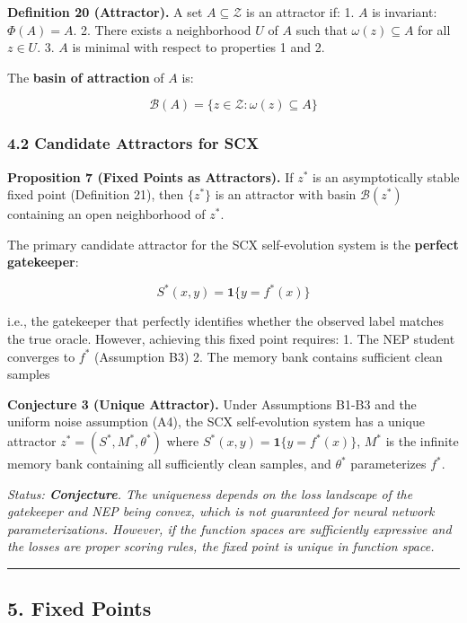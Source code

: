 \documentclass[
  12pt,
]{article}
\begin{document}
\textbf{Definition 20 (Attractor).} A set \(A \subseteq \mathcal{Z}\) is
an attractor if: 1. \(A\) is invariant: \(\Phi(A) = A\). 2. There exists
a neighborhood \(U\) of \(A\) such that \(\omega(z) \subseteq A\) for
all \(z \in U\). 3. \(A\) is minimal with respect to properties 1 and 2.

The \textbf{basin of attraction} of \(A\) is:

\[\mathcal{B}(A) = \{ z \in \mathcal{Z} : \omega(z) \subseteq A \}\]

\subsubsection{4.2 Candidate Attractors for
SCX}\label{candidate-attractors-for-scx}

\textbf{Proposition 7 (Fixed Points as Attractors).} If \(z^*\) is an
asymptotically stable fixed point (Definition 21), then \(\{z^*\}\) is
an attractor with basin \(\mathcal{B}(z^*)\) containing an open
neighborhood of \(z^*\).

The primary candidate attractor for the SCX self-evolution system is the
\textbf{perfect gatekeeper}:

\[S^*(x,y) = \mathbf{1}\{y = f^*(x)\}\]

i.e., the gatekeeper that perfectly identifies whether the observed
label matches the true oracle. However, achieving this fixed point
requires: 1. The NEP student converges to \(f^*\) (Assumption B3) 2. The
memory bank contains sufficient clean samples

\textbf{Conjecture 3 (Unique Attractor).} Under Assumptions B1-B3 and
the uniform noise assumption (A4), the SCX self-evolution system has a
unique attractor \(z^* = (S^*, M^*, \theta^*)\) where
\(S^*(x,y) = \mathbf{1}\{y = f^*(x)\}\), \(M^*\) is the infinite memory
bank containing all sufficiently clean samples, and \(\theta^*\)
parameterizes \(f^*\).

\emph{Status: \textbf{Conjecture}. The uniqueness depends on the loss
landscape of the gatekeeper and NEP being convex, which is not
guaranteed for neural network parameterizations. However, if the
function spaces are sufficiently expressive and the losses are proper
scoring rules, the fixed point is unique in function space.}

\begin{center}\rule{0.5\linewidth}{0.5pt}\end{center}

\subsection{5. Fixed Points}\label{fixed-points}
\end{document}
